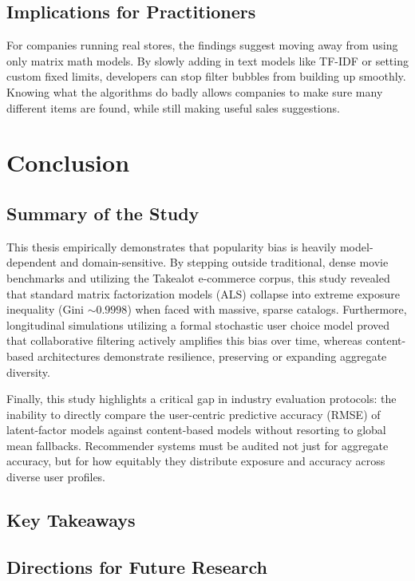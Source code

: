 \documentclass[11pt,a4paper]{report}
\begin{document}
\section{Implications for Practitioners}
For companies running real stores, the findings suggest moving away from using only matrix math models. By slowly adding in text models like TF-IDF or setting custom fixed limits, developers can stop filter bubbles from building up smoothly. Knowing what the algorithms do badly allows companies to make sure many different items are found, while still making useful sales suggestions.

\chapter{Conclusion}
\label{ch:conclusion_final}

\section{Summary of the Study}
This thesis empirically demonstrates that popularity bias is heavily model-dependent and domain-sensitive. By stepping outside traditional, dense movie benchmarks and utilizing the Takealot e-commerce corpus, this study revealed that standard matrix factorization models (ALS) collapse into extreme exposure inequality (Gini $\sim 0.9998$) when faced with massive, sparse catalogs. Furthermore, longitudinal simulations utilizing a formal stochastic user choice model proved that collaborative filtering actively amplifies this bias over time, whereas content-based architectures demonstrate resilience, preserving or expanding aggregate diversity.

Finally, this study highlights a critical gap in industry evaluation protocols: the inability to directly compare the user-centric predictive accuracy (RMSE) of latent-factor models against content-based models without resorting to global mean fallbacks. Recommender systems must be audited not just for aggregate accuracy, but for how equitably they distribute exposure and accuracy across diverse user profiles.

\section{Key Takeaways}

\section{Directions for Future Research}
\end{document}
